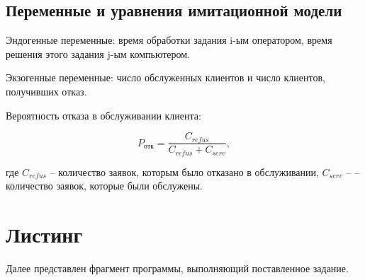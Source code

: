 \documentclass[14pt]{extreport}
\begin{document}
\subsection{Переменные и уравнения имитационной модели}

Эндогенные переменные: время обработки задания i-ым оператором, время решения этого задания j-ым компьютером.

Экзогенные переменные: число обслуженных клиентов и число клиентов, получивших отказ.

Вероятность отказа в обслуживании клиента:

\begin{equation}
	P_{отк} = \frac{C_{refus}}{C_{refus} + C_{serv}},
\end{equation}

где $C_{refus}$ -- количество заявок, которым было отказано в обслуживании, $C_{serv}$ -- – количество заявок, которые были обслужены.

\section{Листинг}

Далее представлен фрагмент программы, выполняющий поставленное задание.
\end{document}
